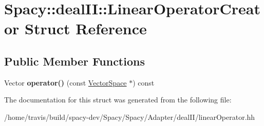 \hypertarget{structSpacy_1_1dealII_1_1LinearOperatorCreator}{\section{\-Spacy\-:\-:deal\-I\-I\-:\-:\-Linear\-Operator\-Creator \-Struct \-Reference}
\label{structSpacy_1_1dealII_1_1LinearOperatorCreator}
}
\subsection*{\-Public \-Member \-Functions}
\begin{DoxyCompactItemize}
\item 
\hypertarget{structSpacy_1_1dealII_1_1LinearOperatorCreator_a2f608aa462b65fe69bfa8e61659f6534}{\-Vector {\bfseries operator()} (const \hyperlink{classSpacy_1_1VectorSpace}{\-Vector\-Space} $\ast$) const }\label{structSpacy_1_1dealII_1_1LinearOperatorCreator_a2f608aa462b65fe69bfa8e61659f6534}

\end{DoxyCompactItemize}


\-The documentation for this struct was generated from the following file\-:\begin{DoxyCompactItemize}
\item 
/home/travis/build/spacy-\/dev/\-Spacy/\-Spacy/\-Adapter/deal\-I\-I/linear\-Operator.\-hh\end{DoxyCompactItemize}
